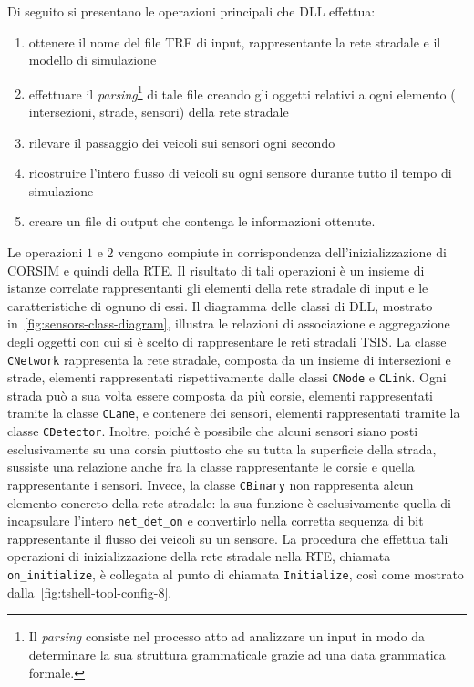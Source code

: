 Di seguito si presentano le operazioni principali che  \acs{DLL} effettua:
\begin{enumerate}
    \item ottenere il nome del file \acs{TRF} di input, rappresentante la rete stradale e il modello di simulazione
    \item effettuare il \emph{parsing}\footnote{Il \emph{parsing} consiste nel processo atto ad analizzare un input in modo da determinare la sua struttura grammaticale grazie ad una data grammatica formale.} di tale file creando gli oggetti relativi a ogni elemento (\eg{} intersezioni, strade, sensori) della rete stradale
    \item rilevare il passaggio dei veicoli sui sensori ogni secondo
    \item ricostruire l'intero flusso di veicoli su ogni sensore durante tutto il tempo di simulazione
    \item creare un file di output che contenga le informazioni ottenute.
\end{enumerate}
Le operazioni $1$ e $2$ vengono compiute in corrispondenza dell'inizializzazione di \acs{CORSIM} e quindi della \acs{RTE}. Il risultato di tali operazioni è un insieme di istanze correlate rappresentanti gli elementi della rete stradale di input e le caratteristiche di ognuno di essi. Il diagramma delle classi di  \acs{DLL}, mostrato in~\vref{fig:sensors-class-diagram}, illustra le relazioni di associazione e aggregazione degli oggetti con cui si è scelto di rappresentare le reti stradali \acs{TSIS}. La classe \lstinline[]|CNetwork| rappresenta la rete stradale, composta da un insieme di intersezioni e strade, elementi rappresentati rispettivamente dalle classi \lstinline[]|CNode| e \lstinline[]|CLink|. Ogni strada può a sua volta essere composta da più corsie, elementi rappresentati tramite la classe \lstinline[]|CLane|, e contenere dei sensori, elementi rappresentati tramite la classe \lstinline[]|CDetector|. Inoltre, poiché è possibile che alcuni sensori siano posti esclusivamente su una corsia piuttosto che su tutta la superficie della strada, sussiste una relazione anche fra la classe rappresentante le corsie e quella rappresentante i sensori. Invece, la classe \lstinline[]|CBinary| non rappresenta alcun elemento concreto della rete stradale: la sua funzione è esclusivamente quella di incapsulare l'intero \lstinline[]|net_det_on| e convertirlo nella corretta sequenza di bit rappresentante il flusso dei veicoli su un sensore. La procedura che effettua tali operazioni di inizializzazione della rete stradale nella \acs{RTE}, chiamata \lstinline[]|on_initialize|, è collegata al punto di chiamata \lstinline[]|Initialize|, così come mostrato dalla~\vref{fig:tshell-tool-config-8}.

